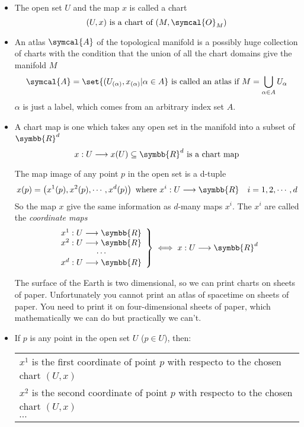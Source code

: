\begin{itemize}
\item The open set $U$ and the map $x$ is called a chart
  \[
    (U,x) \text{ is a chart of } (M,\symcal{O}_M)
  \]
\item An atlas $\symcal{A}$ of the topological manifold is a possibly huge collection of charts
  with the condition that the union of all the chart domains give the manifold $M$
  \[
    \symcal{A} = \set{(U_{(\alpha)},x_{(\alpha)} | \alpha\in A}
    \text{ is called an atlas if } M = \bigcup_{\alpha\in A} U_\alpha
  \]
  $\alpha$ is just a label, which comes from an arbitrary index set $A$.
\item A chart map is one which takes any open set in the manifold into a subset of $\symbb{R}^d$
  \[
    x : U \longrightarrow x(U)\subseteq\symbb{R}^d
    \text{ is a chart map}
  \]
  
  The map image of any point $p$ in the open set is a d-tuple
  \[
    x(p) = \left(x^1(p), x^2(p),\cdots,x^d(p)\right)
    \text{ where }
    x^i : U \longrightarrow \symbb{R}
    \hspace{1em}
    i = 1, 2, \cdots, d
  \]
  So the map $x$ give the same information as $d$-many maps $x^i$.
  The $x^i$ are called the \emph{coordinate maps}
  \[
    \left.
      \begin{array}{c}
        x^1 : U \longrightarrow \symbb{R}\\
        x^2 : U \longrightarrow \symbb{R}\\
        \cdots\\
        x^d : U \longrightarrow \symbb{R}
      \end{array}
    \right\}
    \iff
    x : U \longrightarrow \symbb{R}^d
  \]
  
  The surface of the Earth is two dimensional, so we can print charts on sheets of paper.
  Unfortunately you cannot print an atlas of spacetime on sheets of paper. You need to print it
  on four-dimensional sheets of paper, which mathematically we can do but practically we can't.
  
\item If $p$ is any point in the open set $U$ ($p\in U$), then:
  \vspace{-4ex}
  \begin{center}
    \begin{tabular}{l}
      $x^1$ is the first coordinate of point $p$ with respecto to the chosen chart $(U,x)$\\
      $x^2$ is the second coordinate of point $p$ with respecto to the chosen chart $(U,x)$\\
      $\cdots$
    \end{tabular}
  \end{center}
  

\end{itemize}
